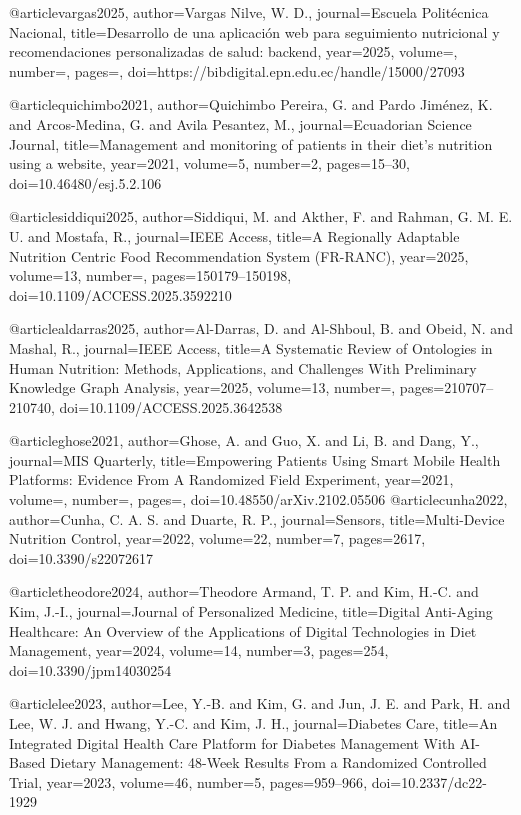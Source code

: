 @article{vargas2025,
  author={Vargas Nilve, W. D.},
  journal={Escuela Politécnica Nacional},
  title={Desarrollo de una aplicación web para seguimiento nutricional y recomendaciones personalizadas de salud: backend},
  year={2025},
  volume={},
  number={},
  pages={},
  doi={https://bibdigital.epn.edu.ec/handle/15000/27093}
}

@article{quichimbo2021,
  author={Quichimbo Pereira, G. and Pardo Jiménez, K. and Arcos-Medina, G. and Avila Pesantez, M.},
  journal={Ecuadorian Science Journal},
  title={Management and monitoring of patients in their diet's nutrition using a website},
  year={2021},
  volume={5},
  number={2},
  pages={15--30},
  doi={10.46480/esj.5.2.106}
}

@article{siddiqui2025,
  author={Siddiqui, M. and Akther, F. and Rahman, G. M. E. U. and Mostafa, R.},
  journal={IEEE Access},
  title={A Regionally Adaptable Nutrition Centric Food Recommendation System (FR-RANC)},
  year={2025},
  volume={13},
  number={},
  pages={150179--150198},
  doi={10.1109/ACCESS.2025.3592210}
}

@article{aldarras2025,
  author={Al-Darras, D. and Al-Shboul, B. and Obeid, N. and Mashal, R.},
  journal={IEEE Access},
  title={A Systematic Review of Ontologies in Human Nutrition: Methods, Applications, and Challenges With Preliminary Knowledge Graph Analysis},
  year={2025},
  volume={13},
  number={},
  pages={210707--210740},
  doi={10.1109/ACCESS.2025.3642538}
}

@article{ghose2021,
  author={Ghose, A. and Guo, X. and Li, B. and Dang, Y.},
  journal={MIS Quarterly},
  title={Empowering Patients Using Smart Mobile Health Platforms: Evidence From A Randomized Field Experiment},
  year={2021},
  volume={},
  number={},
  pages={},
  doi={10.48550/arXiv.2102.05506}
}
@article{cunha2022,
author={Cunha, C. A. S. and Duarte, R. P.},
journal={Sensors},
title={Multi-Device Nutrition Control},
year={2022},
volume={22},
number={7},
pages={2617},
doi={10.3390/s22072617}
}

@article{theodore2024,
author={Theodore Armand, T. P. and Kim, H.-C. and Kim, J.-I.},
journal={Journal of Personalized Medicine},
title={Digital Anti-Aging Healthcare: An Overview of the Applications of Digital Technologies in Diet Management},
year={2024},
volume={14},
number={3},
pages={254},
doi={10.3390/jpm14030254}
}

@article{lee2023,
author={Lee, Y.-B. and Kim, G. and Jun, J. E. and Park, H. and Lee, W. J. and Hwang, Y.-C. and Kim, J. H.},
journal={Diabetes Care},
title={An Integrated Digital Health Care Platform for Diabetes Management With AI-Based Dietary Management: 48-Week Results From a Randomized Controlled Trial},
year={2023},
volume={46},
number={5},
pages={959--966},
doi={10.2337/dc22-1929}
}

